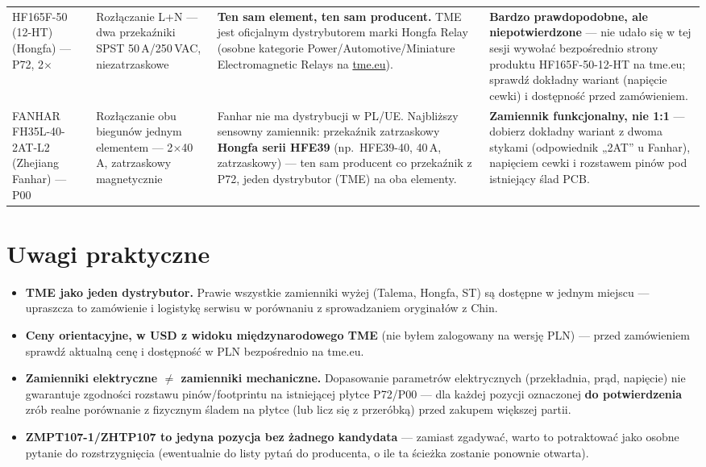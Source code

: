 \documentclass[11pt]{article}
\newcommand{\key}[1]{\textbf{\color{navy}#1}}
\newcommand{\watch}[1]{\textbf{\color{watch}#1}}
\begin{document}
\begin{xltabular}{\linewidth}{@{}p{2.6cm} p{2.5cm} Y p{2.6cm}@{}}
HF165F-50 (12-HT) \newline \footnotesize (Hongfa) — P72, 2$\times$ &
Rozłączanie L+N — dwa przekaźniki SPST 50\,A/250\,VAC, niezatrzaskowe &
\key{Ten sam element, ten sam producent.} TME jest oficjalnym dystrybutorem marki Hongfa Relay (osobne kategorie Power/Automotive/Miniature Electromagnetic Relays na \href{https://www.tme.eu/en/katalog/relays_40/p,hongfa-relay_575/}{tme.eu}). &
\watch{Bardzo prawdopodobne, ale niepotwierdzone} — nie udało się w tej sesji wywołać bezpośrednio strony produktu HF165F-50-12-HT na tme.eu; sprawdź dokładny wariant (napięcie cewki) i dostępność przed zamówieniem. \\
\addlinespace

FANHAR FH35L-40-2AT-L2 \newline \footnotesize (Zhejiang Fanhar) — P00 &
Rozłączanie obu biegunów jednym elementem — 2$\times$40\,A, zatrzaskowy magnetycznie &
Fanhar nie ma dystrybucji w PL/UE. Najbliższy sensowny zamiennik: przekaźnik zatrzaskowy \key{Hongfa serii HFE39} (np.\ HFE39-40, 40\,A, zatrzaskowy) — ten sam producent co przekaźnik z P72, jeden dystrybutor (TME) na oba elementy. &
\watch{Zamiennik funkcjonalny, nie 1:1} — dobierz dokładny wariant z dwoma stykami (odpowiednik „2AT'' u Fanhar), napięciem cewki i rozstawem pinów pod istniejący ślad PCB. \\

\bottomrule
\end{xltabular}
\normalsize

\section{Uwagi praktyczne}
\begin{itemize}
\item \key{TME jako jeden dystrybutor.} Prawie wszystkie zamienniki wyżej (Talema, Hongfa, ST) są dostępne w jednym miejscu — upraszcza to zamówienie i logistykę serwisu w porównaniu z sprowadzaniem oryginałów z Chin.
\item \key{Ceny orientacyjne, w USD z widoku międzynarodowego TME} (nie byłem zalogowany na wersję PLN) — przed zamówieniem sprawdź aktualną cenę i dostępność w PLN bezpośrednio na tme.eu.
\item \key{Zamienniki elektryczne $\neq$ zamienniki mechaniczne.} Dopasowanie parametrów elektrycznych (przekładnia, prąd, napięcie) nie gwarantuje zgodności rozstawu pinów/footprintu na istniejącej płytce P72/P00 — dla każdej pozycji oznaczonej \watch{do potwierdzenia} zrób realne porównanie z fizycznym śladem na płytce (lub licz się z przeróbką) przed zakupem większej partii.
\item \key{ZMPT107-1/ZHTP107 to jedyna pozycja bez żadnego kandydata} — zamiast zgadywać, warto to potraktować jako osobne pytanie do rozstrzygnięcia (ewentualnie do listy pytań do producenta, o ile ta ścieżka zostanie ponownie otwarta).
\end{itemize}
\end{document}
